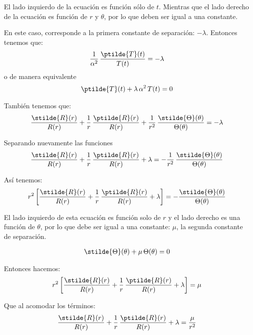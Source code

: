 El lado izquierdo de la ecuación es función sólo de $t$. Mientras que el lado derecho de la ecuación es función de $r$ y $\theta$, por lo que deben ser igual a una constante.
\par
En este caso, corresponde a la primera constante de separación: $- \lambda$. Entonces tenemos que:
\begin{align*}
\dfrac{1}{\alpha^{2}} \, \dfrac{\ptilde{T} (t)}{T (t)} = - \lambda
\end{align*}
o de manera equivalente
\begin{align}
\ptilde{T}(t) + \lambda \, \alpha^{2} \, T(t) = 0
\label{eq:ecuacion_K02}    
\end{align}

También tenemos que:
\begin{align*}
\dfrac{\stilde{R} (r)}{R (r)} + \dfrac{1}{r} \, \dfrac{\ptilde{R} (r)}{R (r)} + \dfrac{1}{r^{2}} \, \dfrac{\stilde{\Theta} (\theta)}{\Theta (\theta)} = - \lambda
\end{align*}

Separando nuevamente las funciones
\begin{align*}
\dfrac{\stilde{R} (r)}{R (r)} + \dfrac{1}{r} \, \dfrac{\ptilde{R} (r)}{R (r)} + \lambda = - \dfrac{1}{r^{2}} \, \dfrac{\stilde{\Theta} (\theta)}{\Theta (\theta)}
\end{align*}

Así tenemos:
\begin{align}
r^{2} \left[ \dfrac{\stilde{R} (r)}{R (r)} + \dfrac{1}{r} \, \dfrac{\ptilde{R} (r)}{R (r)} + \lambda \right] = - \dfrac{\stilde{\Theta} (\theta)}{\Theta (\theta)}
\label{eq:ecuacion_K03}    
\end{align}

El lado izquierdo de esta ecuación es función solo de $r$ y el lado derecho es una función de $\theta$, por lo que debe ser igual a una constante: $\mu$, la segunda constante de separación.

\begin{align}
\stilde{\Theta} (\theta) + \mu \, \Theta (\theta) = 0
\label{eq:ecuacion_K04}    
\end{align}

Entonces hacemos:
\begin{align*}
r^{2} \left[ \dfrac{\stilde{R} (r)}{R (r)} + \dfrac{1}{r} \, \dfrac{\ptilde{R} (r)}{R (r)} + \lambda \right] = \mu
\end{align*}

Que al acomodar los términos:
\begin{align*}
\dfrac{\stilde{R} (r)}{R (r)} + \dfrac{1}{r} \, \dfrac{\ptilde{R} (r)}{R (r)} + \lambda = \dfrac{\mu}{r^{2}}
\end{align*}

